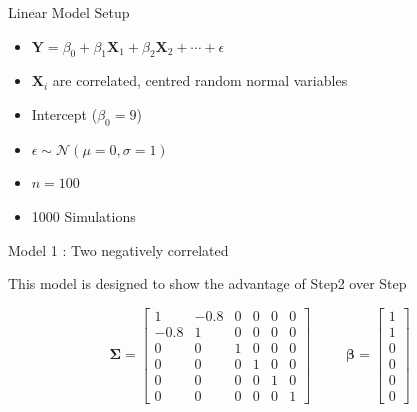 \documentclass[ignorenonframetext,]{beamer}
\providecommand{\tightlist}{%
  \setlength{\itemsep}{0pt}\setlength{\parskip}{0pt}}
\begin{document}
\begin{frame}{Linear Model Setup}

\begin{itemize}
\tightlist
\item
  \(\mathbf Y = \beta_0 + \beta_1 \mathbf X_1 + \beta_2 \mathbf X_2 + \cdots + \epsilon\)
\item
  \(\mathbf X_i\) are correlated, centred random normal variables
\item
  Intercept (\(\beta_0 = 9\))
\item
  \(\epsilon \sim \mathcal N(\mu = 0, \sigma = 1)\)
\item
  \(n = 100\)
\item
  1000 Simulations
\end{itemize}

\end{frame}

\begin{frame}{Model 1 : Two negatively correlated}

This model is designed to show the advantage of Step2 over Step

\[ \boldsymbol{\Sigma} =\begin{bmatrix}
1   &-0.8 & 0 & 0 & 0 & 0 \\
-0.8& 1   & 0 & 0 & 0 & 0 \\
0   & 0   & 1 & 0 & 0 & 0 \\
0   & 0   & 0 & 1 & 0 & 0 \\
0   & 0   & 0 & 0 & 1 & 0 \\
0   & 0   & 0 & 0 & 0 & 1
\end{bmatrix} \hspace{10pt}
\hspace{20pt}
\boldsymbol{\beta} = \begin{bmatrix} 1 \\ 1 \\ 0 \\ 0 \\ 0 \\ 0 \end{bmatrix}\]

\end{frame}
\end{document}
